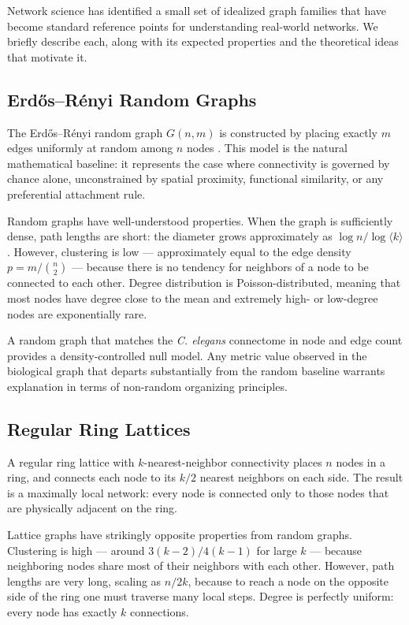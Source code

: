 \documentclass[12pt,a4paper]{report}
\begin{document}
Network science has identified a small set of idealized graph families that have become standard reference points for understanding real-world networks. We briefly describe each, along with its expected properties and the theoretical ideas that motivate it.

\subsection{Erd\H{o}s--R\'{e}nyi Random Graphs}

The Erd\H{o}s--R\'{e}nyi random graph $G(n, m)$ is constructed by placing exactly $m$ edges uniformly at random among $n$ nodes \cite{erdos1959random}. This model is the natural mathematical baseline: it represents the case where connectivity is governed by chance alone, unconstrained by spatial proximity, functional similarity, or any preferential attachment rule.

Random graphs have well-understood properties. When the graph is sufficiently dense, path lengths are short: the diameter grows approximately as $\log n / \log \langle k \rangle$. However, clustering is low — approximately equal to the edge density $p = m/\binom{n}{2}$ — because there is no tendency for neighbors of a node to be connected to each other. Degree distribution is Poisson-distributed, meaning that most nodes have degree close to the mean and extremely high- or low-degree nodes are exponentially rare.

A random graph that matches the \textit{C. elegans} connectome in node and edge count provides a density-controlled null model. Any metric value observed in the biological graph that departs substantially from the random baseline warrants explanation in terms of non-random organizing principles.

\subsection{Regular Ring Lattices}

A regular ring lattice with $k$-nearest-neighbor connectivity places $n$ nodes in a ring, and connects each node to its $k/2$ nearest neighbors on each side. The result is a maximally local network: every node is connected only to those nodes that are physically adjacent on the ring.

Lattice graphs have strikingly opposite properties from random graphs. Clustering is high — around $3(k-2)/4(k-1)$ for large $k$ — because neighboring nodes share most of their neighbors with each other. However, path lengths are very long, scaling as $n/2k$, because to reach a node on the opposite side of the ring one must traverse many local steps. Degree is perfectly uniform: every node has exactly $k$ connections.
\end{document}
